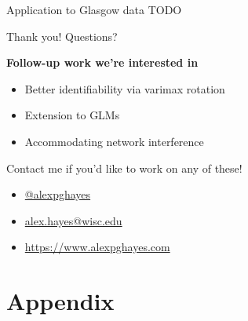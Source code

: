 \documentclass{beamer}
\theoremstyle{remark}
\begin{document}
\begin{frame}{Application to Glasgow data}
    TODO
\end{frame}

\begin{frame}{Thank you! Questions?}

    \textbf{Follow-up work we're interested in}

    \begin{itemize}
        \item Better identifiability via varimax rotation
        \item Extension to GLMs
        \item Accommodating network interference
    \end{itemize}

    Contact me if you'd like to work on any of these!

    \begin{itemize}
        \item[]  \href{https://twitter.com/alexpghayes}{@alexpghayes}
        \item[]  \href{mailto:alex.hayes@wisc.edu}{alex.hayes@wisc.edu}
        \item[]  \url{https://www.alexpghayes.com}
    \end{itemize}

\end{frame}







\section{Appendix}
\end{document}
